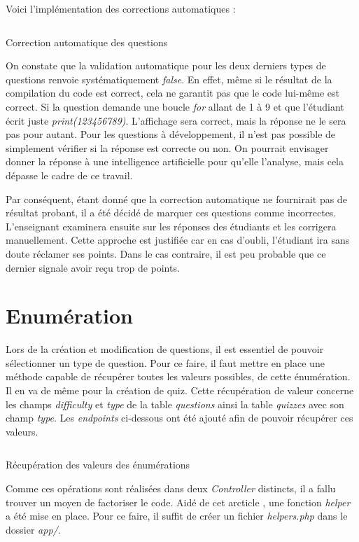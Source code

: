 Voici l'implémentation des corrections automatiques :

\begin{listing}[H]
    \inputminted{php}{assets/code/questionValidation.php}
    \caption{Correction automatique des questions}
\end{listing}

On constate que la validation automatique pour les deux derniers types de questions renvoie systématiquement \emph{false}. En effet, même si le résultat de la compilation du code est correct, cela ne garantit pas que le code lui-même est correct. Si la question demande une boucle \emph{for} allant de 1 à 9 et que l'étudiant écrit juste \emph{print(123456789)}. L'affichage sera correct, mais la réponse ne le sera pas pour autant. Pour les questions à développement, il n'est pas possible de simplement vérifier si la réponse est correcte ou non. On pourrait envisager donner la réponse à une intelligence artificielle pour qu'elle l'analyse, mais cela dépasse le cadre de ce travail.

Par conséquent, étant donné que la correction automatique ne fournirait pas de résultat probant, il a été décidé de marquer ces questions comme incorrectes. L'enseignant examinera  ensuite sur les réponses des étudiants et les corrigera manuellement. Cette approche est justifiée car en cas d'oubli, l'étudiant ira sans doute réclamer ses points. Dans le cas contraire, il est peu probable que ce dernier signale avoir reçu trop de points.

\section{Enumération}
Lors de la création et modification de questions, il est essentiel de pouvoir sélectionner un type de question. Pour ce faire, il faut mettre en place une méthode capable de récupérer toutes les valeurs possibles, de cette énumération. Il en va de même pour la création de quiz. Cette récupération de valeur concerne les champs \emph{difficulty} et \emph{type} de la table \emph{questions} ainsi la table \emph{quizzes} avec son champ \emph{type}. Les \emph{endpoints} ci-dessous ont été ajouté afin de pouvoir récupérer ces valeurs.

\begin{listing}[H]
    \inputminted{php}{assets/code/enumEndpoints.php}
    \caption{Récupération des valeurs des énumérations}
\end{listing}

Comme ces opérations sont réalisées dans deux \emph{Controller} distincts, il a fallu trouver un moyen de factoriser le code. Aidé de cet arcticle \cite{HelperLaravel}, une fonction \emph{helper} a été mise en place. Pour ce faire, il suffit de créer un fichier \emph{helpers.php} dans le dossier \emph{app/}.

